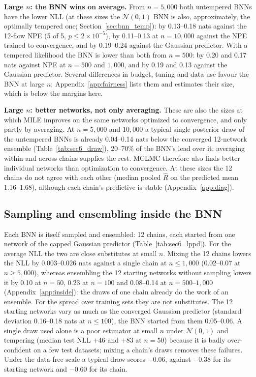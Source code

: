 \documentclass[11pt]{article}
\begin{document}
\textbf{Large $n$: the BNN wins on average.} From $n=5{,}000$ both untempered BNNs have the lower NLL (at these sizes the $\mathcal N(0,1)$ BNN is also, approximately,
the optimally tempered one; Section~\ref{sec:bnn_temp}): by 0.13--0.18 nats against the 12-flow NPE (5 of 5,
$p\le2\times10^{-5}$), by 0.11--0.13 at $n=10{,}000$ against the NPE trained to convergence, and by 0.19--0.24 against
the Gaussian predictor. With a tempered likelihood the BNN is lower than both from $n=500$: by 0.20 and 0.17 nats
against NPE at $n=500$ and $1{,}000$, and by 0.19 and 0.13 against the Gaussian predictor. Several differences in budget, tuning and data use favour the BNN
at large $n$; Appendix~\ref{app:fairness} lists them and estimates their size, which is below the margins here.

\textbf{Large $n$: better networks, not only averaging.} These are also the sizes at which MILE improves on the same
networks optimized to convergence, and only partly by averaging. At $n=5{,}000$ and
$10{,}000$ a typical single posterior draw of the untempered BNNs is already 0.04--0.14 nats below the converged
12-network ensemble (Table~\ref{tab:sec6_draw}), 20--70\% of the BNN's lead over it; averaging within and across chains
supplies the rest. MCLMC therefore also finds better individual networks than optimization to convergence. At these
sizes the 12 chains do not agree with each other (median pooled $\widehat R$ on the predicted mean 1.16--1.68), although
each chain's predictive is stable (Appendix~\ref{app:diag}).

\subsection{Sampling and ensembling inside the BNN}
\label{sec:res_inside}
Each BNN is itself sampled and ensembled: 12 chains, each started from one network of the capped Gaussian predictor
(Table~\ref{tab:sec6_lppd}). For the average NLL the two are close substitutes at small $n$. Mixing the 12 chains lowers
the NLL by 0.003--0.026 nats against a single chain at $n\le1{,}000$ (0.02--0.07 at $n\ge5{,}000$), whereas ensembling
the 12 starting networks without sampling lowers it by 0.10 at $n=50$, 0.23 at $n=100$ and 0.08--0.14 at
$n=500$--$1{,}000$ (Appendix~\ref{app:inside}): the draws of one chain already do the work of an ensemble. For the
spread over training sets they are not substitutes. The 12 starting networks vary as much as the converged Gaussian
predictor (standard deviation 0.16--0.18 nats at $n\le100$), the BNN started from them 0.05--0.06. A single draw used
alone is a poor estimator at small $n$ under $\mathcal N(0,1)$ and tempering (median test NLL $+46$ and $+83$ at
$n=50$) because it is badly over-confident on a few test datasets; mixing a chain's draws removes these failures. Under
the data-free scale a typical draw scores $-0.06$, against $-0.38$ for its starting network and $-0.60$ for its chain.
\end{document}
